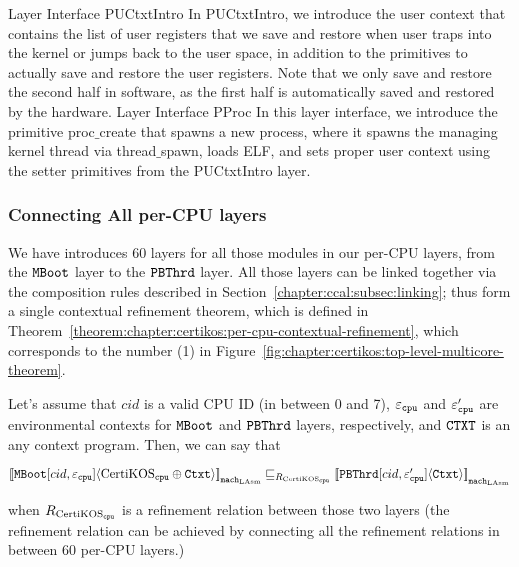 Layer Interface PUCtxtIntro In PUCtxtIntro, we introduce the user context that contains the list of user registers that we save and restore when user traps into the kernel or jumps back to the user space, in addition to the primitives to actually save and restore the user registers. Note that we only save and restore the second half in software, as the first half is automatically saved and restored by the hardware.
Layer Interface PProc In this layer interface, we introduce the primitive proc$\_$create that spawns a new process, where it spawns the managing kernel thread via thread$\_$spawn, loads ELF, and sets proper user context using the setter primitives from the PUCtxtIntro layer.




\subsubsection{Connecting All per-CPU layers}

We have introduces 60 layers for all those modules in our per-CPU layers, from the ${\mathrm{\texttt{MBoot}}}$ layer to the 
${\mathrm{\texttt{PBThrd}}}$ layer.
All those layers can be linked together via the composition rules described in Section~\ref{chapter:ccal:subsec:linking};
thus form a single contextual refinement theorem, which is defined in Theorem~\ref{theorem:chapter:certikos:per-cpu-contextual-refinement},
which corresponds to the number (1) in Figure~\ref{fig:chapter:certikos:top-level-multicore-theorem}.
\begin{theorem}
\label{theorem:chapter:certikos:per-cpu-contextual-refinement}
Let's assume that $cid$ is a valid CPU ID (in between 0 and 7), ${\varepsilon}_{{\mathrm{\texttt{cpu}}}}$ and  ${\varepsilon}'_{{\mathrm{\texttt{cpu}}}}$ are 
environmental contexts for ${\mathrm{\texttt{MBoot}}}$  and ${\mathrm{\texttt{PBThrd}}}$ layers, respectively, and ${\mathrm{\texttt{CTXT}}}$ is an any context program. Then, we can say that
\begin{center}
${[\![{{\mathrm{\texttt{MBoot}}}[cid, {\varepsilon}_{{\mathrm{\texttt{cpu}}}}]} \langle {\mathrm{CertiKOS}_{{\mathrm{\texttt{cpu}}}} \oplus {\mathrm{\texttt{Ctxt}}}} \rangle]\!]}_{{\mathrm{\texttt{mach}}}_{\mathrm{LAsm}}} \sqsubseteq_{R_{\mathrm{CertiKOS}_{\mathrm{\texttt{cpu}}}}} {[\![{{\mathrm{\texttt{PBThrd}}}[cid, {\varepsilon}'_{{\mathrm{\texttt{cpu}}}}]} \langle {{\mathrm{\texttt{Ctxt}}}} \rangle]\!]}_{{{\mathrm{\texttt{mach}}}_{\mathrm{LAsm}}}}$
\end{center}
when ${R_{\mathrm{CertiKOS}_{\mathrm{\texttt{cpu}}}}}$ is a refinement relation between those two layers (the refinement relation can be achieved by 
connecting all the refinement relations in between 60 per-CPU layers.)
\end{theorem}

